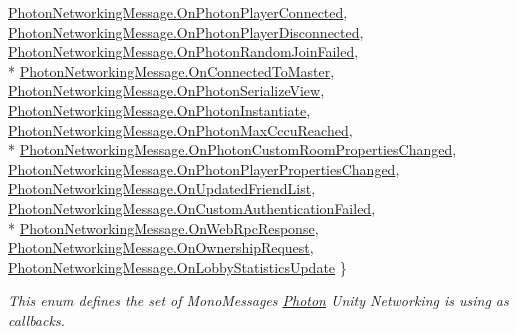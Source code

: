 \begin{DoxyCompactItemize}
\hyperlink{group__public_api_ggaf30bbea51cc8c4b1ddc239d1c5c1468faccfd8b0940a4981818cc4147e29de834}{Photon\+Networking\+Message.\+On\+Photon\+Player\+Connected}, 
\hyperlink{group__public_api_ggaf30bbea51cc8c4b1ddc239d1c5c1468fa39b1e276b8dab1e7620a643b7e01d71c}{Photon\+Networking\+Message.\+On\+Photon\+Player\+Disconnected}, 
\hyperlink{group__public_api_ggaf30bbea51cc8c4b1ddc239d1c5c1468fad07f29ca1e2135927cf0966873408125}{Photon\+Networking\+Message.\+On\+Photon\+Random\+Join\+Failed}, 
\\*
\hyperlink{group__public_api_ggaf30bbea51cc8c4b1ddc239d1c5c1468fa883ba3af22ed6fc336cde8cb71624d30}{Photon\+Networking\+Message.\+On\+Connected\+To\+Master}, 
\hyperlink{group__public_api_ggaf30bbea51cc8c4b1ddc239d1c5c1468fa864e7f0d7510922caf9c107b8dd771a3}{Photon\+Networking\+Message.\+On\+Photon\+Serialize\+View}, 
\hyperlink{group__public_api_ggaf30bbea51cc8c4b1ddc239d1c5c1468faa8bb589bf7df8d2be1f0b4b586ba8001}{Photon\+Networking\+Message.\+On\+Photon\+Instantiate}, 
\hyperlink{group__public_api_ggaf30bbea51cc8c4b1ddc239d1c5c1468fa1d2567b2c2f8ec1799a293b0359b4046}{Photon\+Networking\+Message.\+On\+Photon\+Max\+Cccu\+Reached}, 
\\*
\hyperlink{group__public_api_ggaf30bbea51cc8c4b1ddc239d1c5c1468fafbc17ce96afe80127d732de2d4be0378}{Photon\+Networking\+Message.\+On\+Photon\+Custom\+Room\+Properties\+Changed}, 
\hyperlink{group__public_api_ggaf30bbea51cc8c4b1ddc239d1c5c1468fa67402d95c324cda2b6d6e2fc391ae941}{Photon\+Networking\+Message.\+On\+Photon\+Player\+Properties\+Changed}, 
\hyperlink{group__public_api_ggaf30bbea51cc8c4b1ddc239d1c5c1468fab39600c160a074fb0b76467956dadec9}{Photon\+Networking\+Message.\+On\+Updated\+Friend\+List}, 
\hyperlink{group__public_api_ggaf30bbea51cc8c4b1ddc239d1c5c1468fa03351bfa4fb9325a5b0486862d4be3be}{Photon\+Networking\+Message.\+On\+Custom\+Authentication\+Failed}, 
\\*
\hyperlink{group__public_api_ggaf30bbea51cc8c4b1ddc239d1c5c1468faa98a8b15d4aa12e02e5ccbc98172eecc}{Photon\+Networking\+Message.\+On\+Web\+Rpc\+Response}, 
\hyperlink{group__public_api_ggaf30bbea51cc8c4b1ddc239d1c5c1468fac859a296d058a67508e48b2a0363e71c}{Photon\+Networking\+Message.\+On\+Ownership\+Request}, 
\hyperlink{group__public_api_ggaf30bbea51cc8c4b1ddc239d1c5c1468fab1a1f76626b99f398def802effe4908a}{Photon\+Networking\+Message.\+On\+Lobby\+Statistics\+Update}
 \}\begin{DoxyCompactList}\small\item\em This enum defines the set of Mono\+Messages \hyperlink{namespace_photon}{Photon} Unity Networking is using as callbacks. \end{DoxyCompactList}

\end{DoxyCompactItemize}
